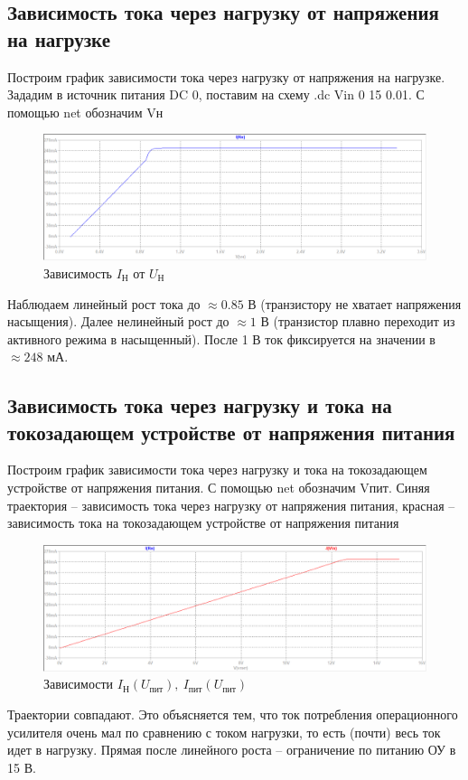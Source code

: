 \documentclass[a4paper, 12pt]{article}
\begin{document}
    \subsection{Зависимость тока через нагрузку от напряжения на нагрузке}
    Построим график зависимости тока через нагрузку от напряжения на нагрузке.
    Зададим в источник питания DC 0, поставим на схему .dc Vin 0 15 0.01.
    С помощью net обозначим Vн
    \begin{figure}[H]
        \centering
        \includegraphics[scale=0.46]{3task_Iн(Vн).png}
        \captionsetup{skip=0pt}
        \caption{Зависимость $I_\text{Н}$ от $U_\text{Н}$}
        \label{fig:3task_InVn}
    \end{figure}
    \noindent Наблюдаем линейный рост тока до $\approx0.85$ В (транзистору не хватает напряжения насыщения).
    Далее нелинейный рост до $\approx1$ В (транзистор плавно переходит из активного режима в насыщенный).
    После 1 В ток фиксируется на значении в $\approx248$ мА.


    \subsection{Зависимость тока через нагрузку и тока на токозадающем устройстве от напряжения питания}
    Построим график зависимости тока через нагрузку и тока на токозадающем устройстве от напряжения питания.
    С помощью net обозначим Vпит. Синяя траектория -- зависимость тока через нагрузку от напряжения питания,
    красная -- зависимость тока на токозадающем устройстве от напряжения питания
    \begin{figure}[H]
        \centering
        \includegraphics[scale=0.46]{3task_Iн(Vпит)_Iпит(Vпит).png}
        \captionsetup{skip=0pt}
        \caption{Зависимости $I_\text{Н}\left( U_\text{пит} \right),\ I_\text{пит}\left( U_\text{пит} \right)$}
        \label{fig:3task_InVl_IlVl}
    \end{figure}
    \noindent Траектории совпадают. Это объясняется тем,
    что ток потребления операционного усилителя очень мал по сравнению с током нагрузки,
    то есть (почти) весь ток идет в нагрузку. Прямая после линейного роста -- ограничение по питанию ОУ в 15 В.
\end{document}
